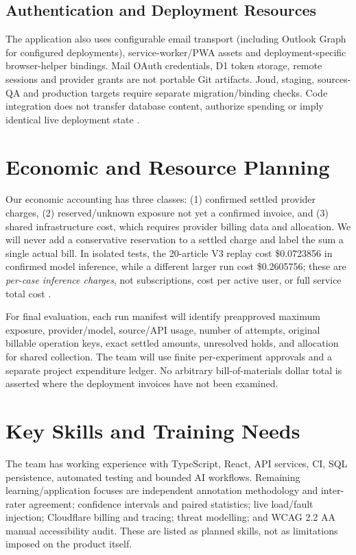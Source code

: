 \subsection{Authentication and Deployment Resources}
The application also uses configurable email transport (including Outlook Graph for configured deployments), service-worker/PWA assets and deployment-specific browser-helper bindings. Mail OAuth credentials, D1 token storage, remote sessions and provider grants are not portable Git artifacts. Joud, staging, sources-QA and production targets require separate migration/binding checks. Code integration does not transfer database content, authorize spending or imply identical live deployment state \cite{currentintegration,preservation}.

\section{Economic and Resource Planning}
Our economic accounting has three classes: (1) confirmed settled provider charges, (2) reserved/unknown exposure not yet a confirmed invoice, and (3) shared infrastructure cost, which requires provider billing data and allocation. We will never add a conservative reservation to a settled charge and label the sum a single actual bill. In isolated tests, the 20-article V3 replay cost \$0.0723856 in confirmed model inference, while a different larger run cost \$0.2605756; these are \emph{per-case inference charges}, not subscriptions, cost per active user, or full service total cost \cite{v3twenty,v3overnight}.

For final evaluation, each run manifest will identify preapproved maximum exposure, provider/model, source/API usage, number of attempts, original billable operation keys, exact settled amounts, unresolved holds, and allocation for shared collection. The team will use finite per-experiment approvals and a separate project expenditure ledger. No arbitrary bill-of-materials dollar total is asserted where the deployment invoices have not been examined.

\section{Key Skills and Training Needs}
The team has working experience with TypeScript, React, API services, CI, SQL persistence, automated testing and bounded AI workflows. Remaining learning/application focuses are independent annotation methodology and inter-rater agreement; confidence intervals and paired statistics; live load/fault injection; Cloudflare billing and tracing; threat modelling; and WCAG 2.2 AA manual accessibility audit. These are listed as planned skills, not as limitations imposed on the product itself.
